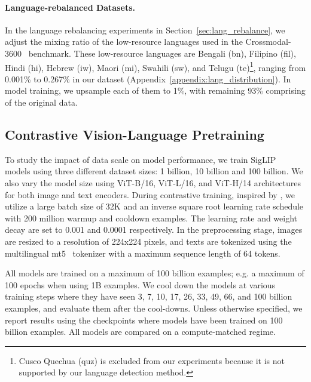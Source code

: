 \paragraph{Language-rebalanced Datasets.}In the language rebalancing experiments in Section~\ref{sec:lang_rebalance}, we adjust the mixing ratio of the low-resource languages used in the Crossmodal-3600~\citep{thapliyal2022crossmodal} benchmark. These low-resource languages are Bengali (bn), Filipino (fil), Hindi (hi), Hebrew (iw), Maori (mi), Swahili (sw), and Telugu (te)\footnote{Cusco Quechua (quz) is excluded from our experiments because it is not supported by our language detection method.}, ranging from 0.001\% to 0.267\% in our dataset (Appendix~\ref{appendix:lang_distribution}). In model training, we upsample each of them to 1\%, with remaining 93\% comprising of the original data.


\subsection{Contrastive Vision-Language Pretraining}
To study the impact of data scale on model performance, we train SigLIP~\citep{zhai2023sigmoidlosslanguageimage} models using three different dataset sizes: 1 billion, 10 billion and 100 billion. 
We also vary the model size using ViT-B/16, ViT-L/16, and ViT-H/14 architectures for both image and text encoders. During contrastive training, inspired by \citet{zhai2106scaling}, we utilize a large batch size of 32K and an inverse square root learning rate schedule with 200 million warmup and cooldown examples. The learning rate and weight decay are set to 0.001 and 0.0001 respectively. In the preprocessing stage, images are resized to a resolution of 224x224 pixels, and texts are tokenized using the multilingual mt5~\citep{xue2020mt5} tokenizer with a maximum sequence length of 64 tokens.

All models are trained on a maximum of 100 billion examples; e.g. a maximum of 100 epochs when using 1B examples. We cool down the models at various training steps where they have seen 3, 7, 10, 17, 26, 33, 49, 66, and 100 billion examples, and evaluate them after the cool-downs. Unless otherwise specified, we report results using the checkpoints where models have been trained on 100 billion examples. All models are compared on a compute-matched regime.

